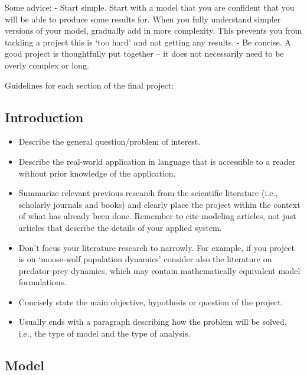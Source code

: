 \documentclass[]{book}
\providecommand{\tightlist}{%
  \setlength{\itemsep}{0pt}\setlength{\parskip}{0pt}}
\begin{document}
Some advice: - Start simple. Start with a model that you are confident
that you will be able to produce some results for. When you fully
understand simpler versions of your model, gradually add in more
complexity. This prevents you from tackling a project this is `too hard'
and not getting any results. - Be concise. A good project is
thoughtfully put together -- it does not necessarily need to be overly
complex or long.

Guidelines for each section of the final project:

\subsection{Introduction}\label{introduction}

\begin{itemize}
\tightlist
\item
  Describe the general question/problem of interest.
\item
  Describe the real-world application in language that is accessible to
  a reader without prior knowledge of the application.
\item
  Summarize relevant previous research from the scientific literature
  (i.e., scholarly journals and books) and clearly place the project
  within the context of what has already been done. Remember to cite
  modeling articles, not just articles that describe the details of your
  applied system.
\item
  Don't focus your literature research to narrowly. For example, if you
  project is on `moose-wolf population dynamics' consider also the
  literature on predator-prey dynamics, which may contain mathematically
  equivalent model formulations.
\item
  Concisely state the main objective, hypothesis or question of the
  project.
\item
  Usually ends with a paragraph describing how the problem will be
  solved, i.e., the type of model and the type of analysis.
\end{itemize}

\subsection{Model}\label{model}
\end{document}
